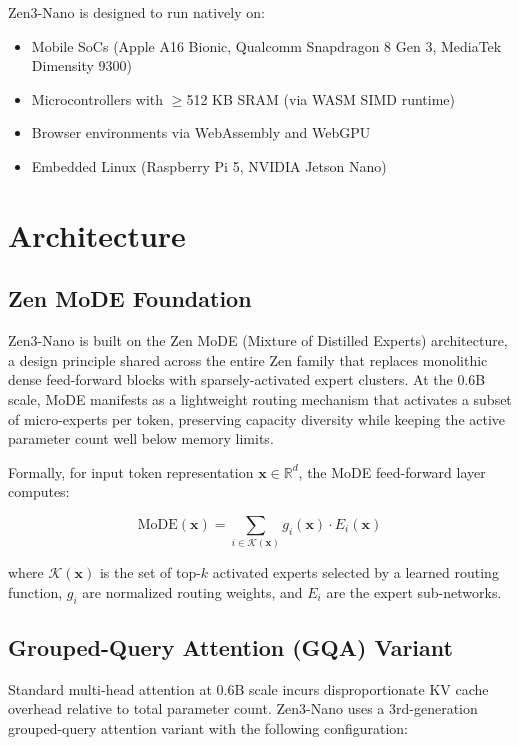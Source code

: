 \documentclass[11pt,a4paper]{article}
\begin{document}
Zen3-Nano is designed to run natively on:
\begin{itemize}
\item Mobile SoCs (Apple A16 Bionic, Qualcomm Snapdragon 8 Gen 3, MediaTek Dimensity 9300)
\item Microcontrollers with $\geq$512 KB SRAM (via WASM SIMD runtime)
\item Browser environments via WebAssembly and WebGPU
\item Embedded Linux (Raspberry Pi 5, NVIDIA Jetson Nano)
\end{itemize}

\section{Architecture}
\label{sec:arch}

\subsection{Zen MoDE Foundation}

Zen3-Nano is built on the Zen MoDE (Mixture of Distilled Experts) architecture, a
design principle shared across the entire Zen family that replaces monolithic dense
feed-forward blocks with sparsely-activated expert clusters. At the 0.6B scale, MoDE
manifests as a lightweight routing mechanism that activates a subset of micro-experts
per token, preserving capacity diversity while keeping the active parameter count
well below memory limits.

Formally, for input token representation $\mathbf{x} \in \mathbb{R}^d$, the MoDE feed-forward
layer computes:

\begin{equation}
\text{MoDE}(\mathbf{x}) = \sum_{i \in \mathcal{K}(\mathbf{x})} g_i(\mathbf{x}) \cdot E_i(\mathbf{x})
\end{equation}

where $\mathcal{K}(\mathbf{x})$ is the set of top-$k$ activated experts selected by a
learned routing function, $g_i$ are normalized routing weights, and $E_i$ are the
expert sub-networks.

\subsection{Grouped-Query Attention (GQA) Variant}

Standard multi-head attention at 0.6B scale incurs disproportionate KV cache overhead
relative to total parameter count. Zen3-Nano uses a 3rd-generation grouped-query attention
variant with the following configuration:
\end{document}
